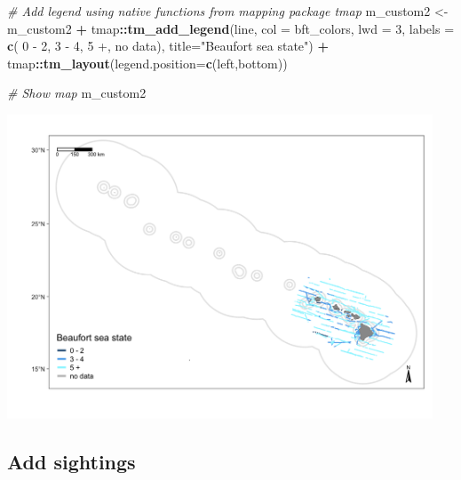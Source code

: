 \documentclass[
]{book}
\newenvironment{Shaded}{\begin{snugshade}}{\end{snugshade}}
\newcommand{\AttributeTok}[1]{\textcolor[rgb]{0.13,0.29,0.53}{#1}}
\newcommand{\CommentTok}[1]{\textcolor[rgb]{0.56,0.35,0.01}{\textit{#1}}}
\newcommand{\DecValTok}[1]{\textcolor[rgb]{0.00,0.00,0.81}{#1}}
\newcommand{\FunctionTok}[1]{\textcolor[rgb]{0.13,0.29,0.53}{\textbf{#1}}}
\newcommand{\NormalTok}[1]{#1}
\newcommand{\OtherTok}[1]{\textcolor[rgb]{0.56,0.35,0.01}{#1}}
\newcommand{\SpecialCharTok}[1]{\textcolor[rgb]{0.81,0.36,0.00}{\textbf{#1}}}
\newcommand{\StringTok}[1]{\textcolor[rgb]{0.31,0.60,0.02}{#1}}
\begin{document}
\begin{Shaded}
\begin{Highlighting}[]
\CommentTok{\# Add legend using native functions from mapping package \textasciigrave{}tmap\textasciigrave{}}
\NormalTok{m\_custom2 }\OtherTok{\textless{}{-}} 
\NormalTok{  m\_custom2 }\SpecialCharTok{+} 
\NormalTok{  tmap}\SpecialCharTok{::}\FunctionTok{tm\_add\_legend}\NormalTok{(}\StringTok{\textquotesingle{}line\textquotesingle{}}\NormalTok{, }
                        \AttributeTok{col =}\NormalTok{ bft\_colors,}
                        \AttributeTok{lwd =} \DecValTok{3}\NormalTok{,}
                        \AttributeTok{labels =} \FunctionTok{c}\NormalTok{(}\StringTok{\textquotesingle{} 0 {-} 2\textquotesingle{}}\NormalTok{, }
                                   \StringTok{\textquotesingle{} 3 {-} 4\textquotesingle{}}\NormalTok{, }
                                   \StringTok{\textquotesingle{} 5 +\textquotesingle{}}\NormalTok{, }
                                   \StringTok{\textquotesingle{} no data\textquotesingle{}}\NormalTok{),}
                         \AttributeTok{title=}\StringTok{"Beaufort sea state"}\NormalTok{) }\SpecialCharTok{+}
\NormalTok{  tmap}\SpecialCharTok{::}\FunctionTok{tm\_layout}\NormalTok{(}\AttributeTok{legend.position=}\FunctionTok{c}\NormalTok{(}\StringTok{\textquotesingle{}left\textquotesingle{}}\NormalTok{,}\StringTok{\textquotesingle{}bottom\textquotesingle{}}\NormalTok{))}

\CommentTok{\# Show map}
\NormalTok{m\_custom2}
\end{Highlighting}
\end{Shaded}

\includegraphics[width=0.95\textwidth,height=\textheight]{img/map_tracks3.png}

\hypertarget{add-sightings}{%
\subsection*{Add sightings}\label{add-sightings}}
\end{document}
